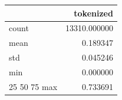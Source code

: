 \begin{tabular}{lr}
\toprule
 & tokenized \\
\midrule
count & 13310.000000 \\
mean & 0.189347 \\
std & 0.045246 \\
min & 0.000000 \\
25%
50%
75%
max & 0.733691 \\
\bottomrule
\end{tabular}
